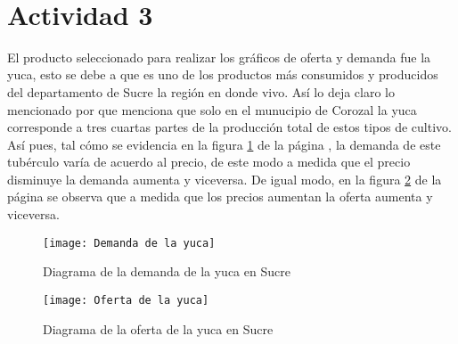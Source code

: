 \justify
\fontsize{12pt}{14}\
\setlength{\parindent}{0cm}

\section{Actividad 3}
\normalsize El producto seleccionado para realizar los gráficos de oferta y demanda fue la yuca, esto se debe a que es uno de los productos más consumidos y producidos del departamento de Sucre la región en donde vivo. Así lo deja claro lo mencionado por \cite{hochschild2024} que menciona que solo en el munucipio de Corozal la yuca corresponde a tres cuartas partes de la producción total de estos tipos de cultivo. Así pues, tal cómo se evidencia en la figura \ref{fig:demanda} de la página \pageref{fig:demanda}, la demanda de este tubérculo varía de acuerdo al precio, de este modo a medida que el precio disminuye la demanda aumenta y viceversa. De igual modo, en la figura \ref{fig:oferta} de la página \pageref{fig:oferta} se observa que a medida que los precios aumentan la oferta aumenta y viceversa.

\begin{figure}[ht!]
    \centering
    \texttt{[image: Demanda de la yuca]}
    \caption{Diagrama de la demanda de la yuca en Sucre}
    \label{fig:demanda}
\end{figure}

\begin{figure}[ht!]
    \centering
    \texttt{[image: Oferta de la yuca]}
    \caption{Diagrama de la oferta de la yuca en Sucre}
    \label{fig:oferta}
\end{figure}